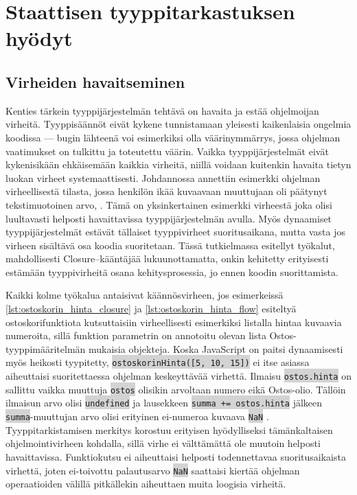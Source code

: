\chapter{Staattisen tyyppitarkastuksen hyödyt}

\section{Virheiden havaitseminen}

Kenties tärkein tyyppijärjestelmän tehtävä on havaita ja estää
ohjelmoijan virheitä. Tyyppisäännöt eivät kykene tunnistamaan yleisesti
kaikenlaisia ongelmia koodissa — bugin lähteenä voi esimerkiksi olla
väärinymmärrys, jossa ohjelman vaatimukset on tulkittu ja toteutettu väärin.
Vaikka tyyppijärjestelmät eivät kykenisikään ehkäisemään kaikkia
virheitä, niillä voidaan kuitenkin havaita tietyn luokan virheet
systemaattisesti. Johdannossa annettiin esimerkki ohjelman virheellisestä
tilasta, jossa henkilön ikää kuvaavaan muuttujaan oli päätynyt tekstimuotoinen
arvo, . Tämä on yksinkertainen esimerkki virheestä joka
olisi luultavasti helposti havaittavissa tyyppijärjestelmän
avulla. Myös dynaamiset tyyppijärjestelmät estävät tällaiset tyyppivirheet
suoritusaikana, mutta vasta jos virheen sisältävä osa koodia suoritetaan.
Tässä tutkielmassa esitellyt työkalut, mahdollisesti Closure–kääntäjää
lukuunottamatta, onkin kehitetty erityisesti estämään tyyppivirheitä
osana kehitysprosessia, jo ennen koodin suorittamista.

Kaikki kolme työkalua antaisivat käännösvirheen, jos esimerkeissä
\ref{lst:ostoskorin_hinta_closure} ja \ref{lst:ostoskorin_hinta_flow}
esiteltyä ostoskorifunktiota kutsuttaisiin virheellisesti esimerkiksi listalla
hintaa kuvaavia numeroita, sillä funktion parametrin on annotoitu olevan
lista Ostos-tyyppimääritelmän mukaisia objekteja. Koska
JavaScript on paitsi dynaamisesti myös heikosti tyypitetty,\newline
\colorbox{lightgray}{\lstinline|ostoskorinHinta([5, 10, 15])|} ei itse
asiassa aiheuttaisi suoritettaessa ohjelman\newline
keskeyttävää virhettä. Ilmaisu 
\colorbox{lightgray}{\lstinline|ostos.hinta|} on sallittu vaikka
muuttuja \colorbox{lightgray}{\lstinline|ostos|} olisikin arvoltaan numero
eikä Ostos-olio. Tällöin ilmaisun arvo olisi \colorbox{lightgray}{\lstinline|undefined|}
ja lausekkeen \colorbox{lightgray}{\lstinline|summa += ostos.hinta|} jälkeen
\colorbox{lightgray}{\lstinline|summa|}-muuttujan arvo olisi erityinen
ei-numeroa kuvaava \colorbox{lightgray}{\lstinline|NaN|} \cite{Ecma262NaN}.
Tyyppitarkistamisen merkitys korostuu erityisen hyödylliseksi
tämänkaltaisen ohjelmointivirheen kohdalla, sillä virhe ei välttämättä ole
muutoin helposti havaittavissa. Funktiokutsu ei aiheuttaisi helposti
todennettavaa suoritusaikaista virhettä, joten ei-toivottu palautusarvo
\colorbox{lightgray}{\lstinline|NaN|} saattaisi kiertää ohjelman
operaatioiden välillä pitkällekin aiheuttaen muita loogisia virheitä.

